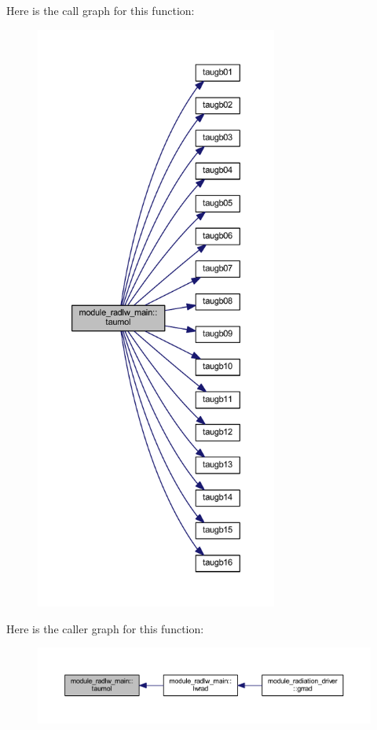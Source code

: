 Here is the call graph for this function\+:\nopagebreak
\begin{figure}[H]
\begin{center}
\leavevmode
\includegraphics[height=550pt]{namespacemodule__radlw__main_a7025e0f49149cf0ddbdd175efb5fe986_cgraph}
\end{center}
\end{figure}




Here is the caller graph for this function\+:\nopagebreak
\begin{figure}[H]
\begin{center}
\leavevmode
\includegraphics[width=350pt]{namespacemodule__radlw__main_a7025e0f49149cf0ddbdd175efb5fe986_icgraph}
\end{center}
\end{figure}




